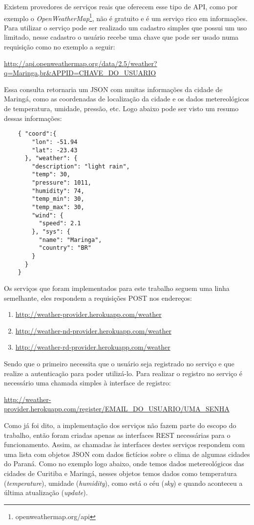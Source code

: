 Existem provedores de serviços reais que oferecem esse tipo de API, como por exemplo o \textit{OpenWeatherMap}\footnote{openweathermap.org/api}, não é gratuito e é um serviço rico em informações. Para utilizar o serviço pode ser realizado um cadastro simples que possui um uso limitado, nesse cadastro o usuário recebe uma chave que pode ser usado numa requisição como no exemplo a seguir:

\url{http://api.openweathermap.org/data/2.5/weather?q=Maringa,br&APPID=CHAVE_DO_USUARIO}

Essa consulta retornaria um JSON com muitas informações da cidade de Maringá, como as coordenadas de localização da cidade e os dados metereológicos de temperatura, umidade, pressão, etc. Logo abaixo pode ser visto um resumo dessas informações:

\begin{verbatim}
    { "coord":{
        "lon": -51.94
        "lat": -23.43
      }, "weather": {
        "description": "light rain",
        "temp": 30,
        "pressure": 1011,
        "humidity": 74,
        "temp_min": 30,
        "temp_max": 30,
        "wind": {
          "speed": 2.1
        }, "sys": {
          "name": "Maringa",
          "country": "BR"
        }
      }
    }
\end{verbatim}

Os serviços que foram implementados para este trabalho seguem uma linha semelhante, eles respondem a requisições POST nos endereços:
\begin{enumerate}
  \item \url{http://weather-provider.herokuapp.com/weather}
  \item \url{http://weather-nd-provider.herokuapp.com/weather}
  \item \url{http://weather-rd-provider.herokuapp.com/weather}
\end{enumerate}

Sendo que o primeiro necessita que o usuário seja registrado no serviço e que realize a autenticação para poder utilizá-lo. Para realizar o registro no serviço é necessário uma chamada simples à interface de registro:

\url{http://weather-provider.herokuapp.com/register/EMAIL_DO_USUARIO/UMA_SENHA}

Como já foi dito, a implementação dos serviços não fazem parte do escopo do trabalho, então foram criadas apenas as interfaces REST necessárias para o funcionamento. Assim, as chamadas às interfaces destes serviços respondem com uma lista com objetos JSON com dados fictícios sobre o clima de algumas cidades do Paraná. Como no exemplo logo abaixo, onde temos dados metereológicos das cidades de Curitiba e Maringá, nesses objetos temos dados como temperatura (\textit{temperature}), umidade (\textit{humidity}), como está o céu (\textit{sky}) e quando aconteceu a última atualização (\textit{update}).

